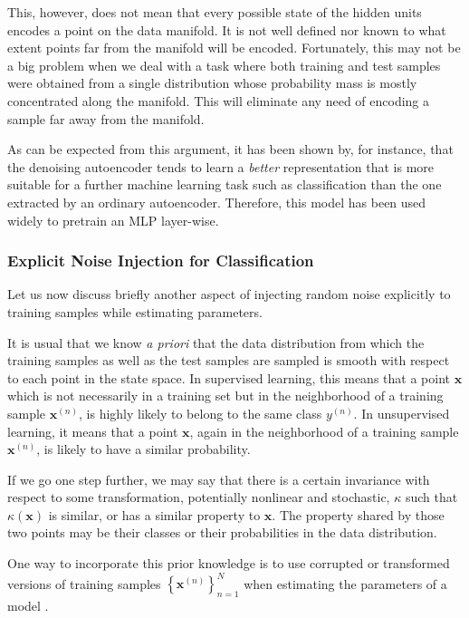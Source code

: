 \documentclass{now}
\newcommand{\vect}[1]{\mathbf{#1}}
\newcommand{\vx}[0]{\vect{x}}
\begin{document}
This, however, does not mean that every possible state of
the hidden units encodes a point on the data manifold. It is
not well defined nor known to what extent points far from the
manifold will be encoded. Fortunately, this may not be a big
problem when we deal with a task where both training and
test samples were obtained from a single
distribution whose probability mass is mostly concentrated
along the manifold. This will eliminate any need of encoding
a sample far away from the manifold.

As can be expected from this argument, it has been shown by,
for instance, \citet{Vincent2010}
that the
denoising autoencoder tends to learn a \textit{better}
representation that is more suitable for a further machine
learning task such as classification than the one extracted
by an ordinary autoencoder. Therefore, this model
has been used widely to pretrain an MLP layer-wise.

\subsubsection{Explicit Noise Injection for Classification}
\label{sec:noise_injection}

Let us now discuss briefly another aspect of injecting random
noise explicitly to training samples while estimating
parameters.

It is usual that we know \textit{a priori} that the data
distribution from which the training samples as well as
the test samples are sampled is smooth with respect to each
point in the state space. In supervised learning, this
means that a point $\vx$ which is not necessarily in a
training set but in the neighborhood of a training sample
$\vx^{(n)}$, is highly likely to belong to the same class
$y^{(n)}$. In unsupervised learning, it means that a point
$\vx$, again in the neighborhood of a training sample
$\vx^{(n)}$, is likely to have a similar probability.

If we go one step further, we may say that there is a
certain invariance with respect to some transformation,
potentially nonlinear and stochastic, $\kappa$ such that
$\kappa(\vx)$ is similar, or has a similar property to
$\vx$. The property shared by those two points may be their
classes or their probabilities in the data distribution.

One way to incorporate this prior
knowledge is to use corrupted or transformed versions of training
samples $\left\{ \vx^{(n)} \right\}_{n=1}^N$ when estimating the
parameters of a model \citep[see, e.g.,][Chapter
5.5]{Bishop2006}. 
\end{document}
